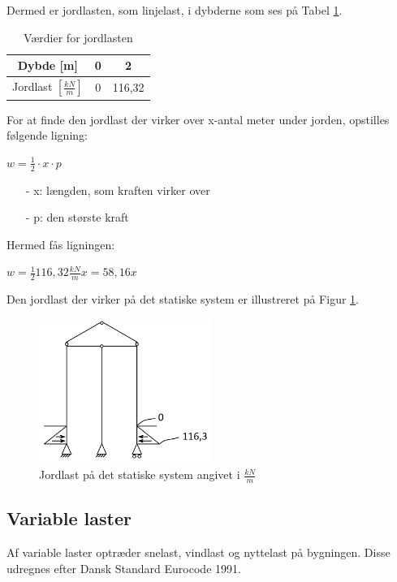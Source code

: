 Dermed er jordlasten, som linjelast, i dybderne som ses på Tabel \ref{tab:jord}.
\begin{table}[htb]
	\begin{center}
		\begin{tabular}{ |c|c|c| } 
		\hline
		Dybde [m] & 0 & 2 \\ \hline
		Jordlast $[\frac{kN}{m}]$ & 0 & 116,32 \\ \hline
		\end{tabular}
		\caption{Værdier for jordlasten}
		\label{tab:jord}
	\end{center}
\end{table}

For at finde den jordlast der virker over x-antal meter under jorden, opstilles følgende ligning:

\begin{center}
	$w = \frac{1}{2} \cdot x \cdot p$
\end{center}

\begin{itemize}
	\item[-] x: længden, som kraften virker over
	\item[-] p: den største kraft
\end{itemize}

Hermed fås ligningen: 
\begin{center}
	$w = \frac{1}{2} 116,\!32 \frac{kN}{m} x = 58,\!16x$
\end{center}

Den jordlast der virker på det statiske system er illustreret på Figur \ref{fig:jordlast}.

\begin{figure}[H]
	\centering
	\includegraphics[width=0.5\textwidth]{billeder/jordlast.png}
	\caption{Jordlast på det statiske system angivet i $\frac{kN}{m}$}
	\label{fig:jordlast}
\end{figure}


\subsection{Variable laster}
Af variable laster optræder snelast, vindlast og nyttelast på bygningen. Disse udregnes efter Dansk Standard Eurocode 1991.

